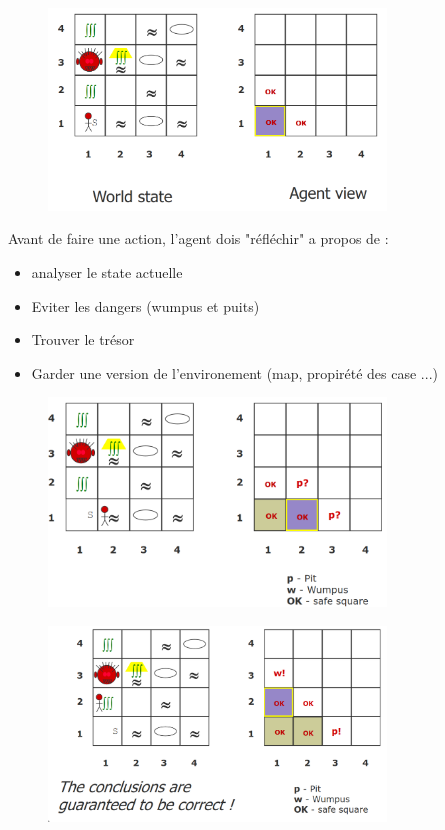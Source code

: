 		\begin{figure}[H]
			\centering
			\includegraphics[width=0.8\textwidth]{img/wumpus.png}
		\end{figure}
		
		Avant de faire une action, l'agent dois "réfléchir" a propos de :
		\begin{itemize}
			\item analyser le state actuelle
			\item Eviter les dangers (wumpus et puits)
			\item Trouver le trésor
			\item Garder une version de l'environement (map, propirété des case ...)
		\end{itemize}
		
		\begin{figure}[H]
			\centering
			\includegraphics[width=0.8\textwidth]{img/wumpus1.png}
		\end{figure}
		
		\begin{figure}[H]
			\centering
			\includegraphics[width=0.8\textwidth]{img/wumpus2.png}
		\end{figure}
		
